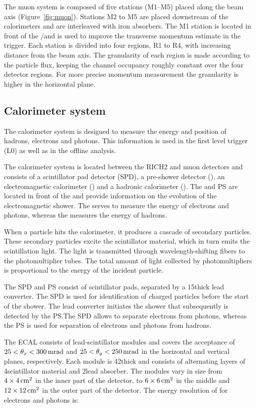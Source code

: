 The muon system is composed of five stations (M1--M5) placed along the
beam axis (Figure~\ref{fig:muon}). Stations M2 to M5 are placed downstream of the
calorimeters and are interleaved with iron absorbers. The M1 station is
located in front of the \spd/\presh and is used to improve the transverse momentum
estimate in the trigger. Each station is divided into four regions, R1 to R4,
with increasing distance from the beam axis. The granularity of each region is
made according to the particle flux, keeping the channel occupancy roughly
constant over the four detector regions. For more precise momentum measurement
the granularity is higher in the horizontal plane.

\subsection{Calorimeter system}

The calorimeter system is designed to measure the energy and position of
hadrons, electrons and photons. This information is used in the first level
trigger (L0) as well as in the offline analysis.

The calorimeter system is located between the RICH2 and muon detectors and
consists of a scintillator pad detector (SPD), a pre-shower detector (\presh), an
electromagnetic calorimeter (\ecal) and a hadronic calorimeter (\hcal). The \spd
and PS are located in front of the \ecal and provide information on the
evolution of the electromagnetic shower. The \ecal serves to measure the energy
of electrons and photons, whereas the \hcal measures the energy of hadrons.

When a particle hits the calorimeter, it produces a cascade of secondary
particles. These secondary particles excite the scintillator material, which in
turn emits the scintillation light. The light is transmitted through
wavelength-shifting fibers to the photomultiplier tubes. The total amount of
light collected by photomultipliers is proportional to the energy of the
incident particle.

The SPD and PS consist of scintillator pads, separated by a 15\mm thick lead
converter. The SPD is used for identification of charged particles before the
start of the shower. The lead converter initiates the shower that subsequently
is detected by the PS.\@ The SPD allows to separate electrons from photons,
whereas the PS is used for separation of electrons and photons from hadrons.

The ECAL consists of lead-scintillator modules and covers the acceptance of
$25<\theta_x< 300\rm \,mrad$ and $25 < \theta_y < 250\rm \,mrad$ in the horizontal and
vertical planes, respectively. Each module is 42\mm thick and consists of
alternating layers of 4\mm scintillator material and 2\mm lead absorber. The
modules vary in size from $4\times4\rm \,cm^2$ in the inner part of the detector, to
$6\times6\rm \,cm^2$ in the middle and $12\times12\rm \,cm^2$ in the outer part of the
detector. The energy resolution of \ecal for electrons and photons is: 

